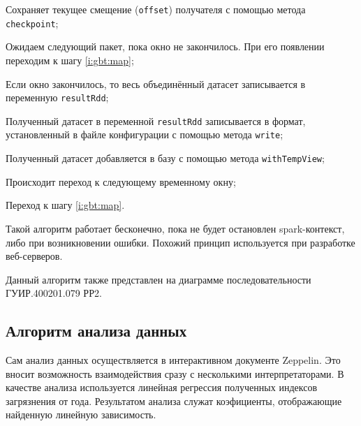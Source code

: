\begin{enumerate_step}
    \item Сохраняет текущее смещение (\texttt{offset}) получателя с помощью метода \texttt{checkpoint};
    \item Ожидаем следующий пакет, пока окно не закончилось. 
    При его появлении переходим к шагу \ref{i:gbt:map};
    \item Если окно закончилось, то весь объединённый датасет записывается в переменную \texttt{resultRdd};
    \item Полученный датасет в переменной \texttt{resultRdd} записывается в формат, установленный в файле конфигурации с помощью метода \texttt{write};
    \item Полученный датасет добавляется в базу с помощью метода \texttt{withTempView};
    \item Происходит переход к следующему временному окну;
    \item Переход к шагу \ref{i:gbt:map}.
\end{enumerate_step}

Такой алгоритм работает бесконечно, пока не будет остановлен spark-контекст, либо при возникновении ошибки.
Похожий принцип используется при разработке веб-серверов.

Данный алгоритм также представлен на диаграмме последовательности ГУИР.400201.079 РР2.


\subsection{Алгоритм анализа данных}

Сам анализ данных осуществляется в интерактивном документе Zeppelin.
Это вносит возможность взаимодействия сразу с несколькими интерпретаторами.
В качестве анализа используется линейная регрессия полученных индексов загрязнения от года.
Результатом анализа служат коэфициенты, отображающие найденную линейную зависимость. 

